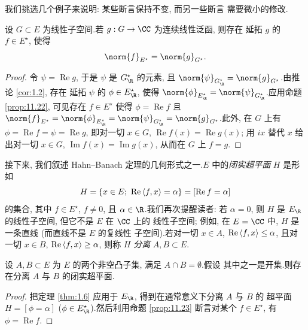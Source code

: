  我们挑选几个例子来说明: 某些断言保持不变, 而另一些断言
需要微小的修改.

\begin{proposition}
\label{prop:11.23}
设 $G\subset E$ 为线性子空间.若 $g:G\to\CC$ 为连续线性泛函, 则存在
延拓 $g$ 的 $f\in E^\star$, 使得
\begin{equation*}
\norm{f}_{E^\star}=\norm{g}_{G^\star}.
\end{equation*}
\end{proposition}

\begin{proof}
令 $\psi=\operatorname{Re}g$, 于是 $\psi$ 是 $G^\star_\R$ 的元素, 且
$\norm{\psi}_{G^\star_\R}=\norm{g}_{G^\star}$.由推论  \ref{cor:1.2}, 存在
延拓 $\psi$ 的 $\phi\in E^\star_\R$, 使得
$\norm{\phi}_{E^\star_\R}=\norm{\psi}_{G^\star_\R}$.应用命题
 \ref{prop:11.22}, 可见存在 $f\in E^\star$ 使得
$\phi=\operatorname{Re}f$ 且
$\norm{f}_{E^\star}=\norm{\phi}_{E^\star_\R}=\norm{\psi}_{G^\star_\R}
=\norm{g}_{G^\star}$.此外, 在 $G$ 上有
$\phi=\operatorname{Re}f=\psi=\operatorname{Re}g$, 即对一切 $x\in G$,
$\operatorname{Re}f(x)=\operatorname{Re}g(x)$; 用 $ix$ 替代 $x$ 给出对一切
$x\in G$, $\operatorname{Im}f(x)=\operatorname{Im}g(x)$, 从而在 $G$ 上
$f=g$.
\end{proof}

接下来, 我们叙述 Hahn--Banach 定理的几何形式之一.$E$ 中的\emph{闭实超平面}
$H$ 是形如
\begin{equation*}
H=\{x\in E;\ \operatorname{Re}\dual{f}{x}=\alpha\}
=[\operatorname{Re}f=\alpha]
\end{equation*}
的集合, 其中 $f\in E^\star$, $f\ne0$, 且 $\alpha\in\R$.我们再次提醒读者:
若 $\alpha=0$, 则 $H$ 是 $E_\R$ 的线性子空间, 但它不是 $E$ 在 $\CC$ 上的
线性子空间; 例如, 在 $E=\CC$ 中, $H$ 是一条直线 (而直线不是 $E$ 的复线性
子空间).若对一切 $x\in A$, $\operatorname{Re}\left\langle f,x\right\rangle\le\alpha$, 且对
一切 $x\in B$, $\operatorname{Re}\left\langle f,x\right\rangle\ge\alpha$, 则称 $H$ \emph{分离}
$A,B\subset E$.

\begin{proposition}
\label{prop:11.24}
设 $A,B\subset E$ 为 $E$ 的两个非空凸子集, 满足 $A\cap B=\emptyset$.假设
其中之一是开集.则存在分离 $A$ 与 $B$ 的闭实超平面.
\end{proposition}

\begin{proof}
把定理  \ref{thm:1.6} 应用于 $E_\R$, 得到在通常意义下分离 $A$ 与 $B$ 的
超平面 $H=[\phi=\alpha]$ ($\phi\in E^\star_\R$).然后利用命题
 \ref{prop:11.23} 断言对某个 $f\in E^\star$, 有 $\phi=\operatorname{Re}f$.
\end{proof}

